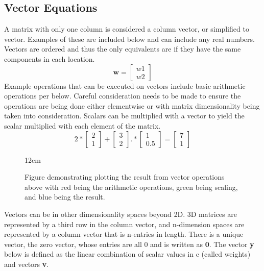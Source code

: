 \documentclass[12pt]{article}
\begin{document}
\subsection{Vector Equations}
A matrix with only one column is considered a column vector, or simplified to vector. Examples of these are included below and can include any real numbers. Vectors%
 are ordered and thus the only equivalents are if they have the same components in each location.
$$
\textbf{w}=\begin{bmatrix}
    \textit{w1}\\
    \textit{w2}
\end{bmatrix}
$$
\newline
Example operations that can be executed on vectors include basic arithmetic operations per below. Careful consideration needs to be made to ensure the operations are being%
done either elementwise or with matrix dimensionality being taken into consideration. Scalars can be multiplied with a vector to yield the scalar multiplied with each %
element of the matrix.
$$
2*\begin{bmatrix}
    2\\
    1
\end{bmatrix}+
\begin{bmatrix}
    3\\
    2
\end{bmatrix}.*
\begin{bmatrix}
    1\\
    0.5
\end{bmatrix}=
\begin{bmatrix}
    7\\
    1
\end{bmatrix}
$$
\newline
\begin{figure}
\centering
\resizebox{\textwidth} {12cm} {   
    }
\caption{Figure demonstrating plotting the result from vector operations above with red being the arithmetic operations, green being scaling, %
and blue being the result.}
\end{figure}
\newline
Vectors can be in other dimensionality spaces beyond 2D. 3D matrices are represented by a third row in the column vector, and n-dimension spaces %
are represented by a column vector that is n-entries in length. There is a unique vector, the zero vector, whose entries are all 0 and is written %
as \textbf{0}.
\newline
\newline
The vector \textbf{y} below is defined as the linear combination of scalar values in c (called weights) and vectors \textbf{v}. 
\end{document}
